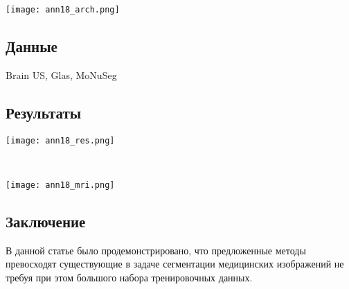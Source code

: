 \begin{minipage}{1.0\linewidth}
    \begin{center}
        \texttt{[image: ann18\_arch.png]} \\
    \end{center}
    
\end{minipage} 
\subsection*{Данные}
Brain US, Glas, MoNuSeg
\subsection*{Результаты}
\begin{minipage}{1.0\linewidth}
    \begin{center}
        \texttt{[image: ann18\_res.png]} \\
    \end{center}
    
\end{minipage} \\

\begin{minipage}{1.0\linewidth}
    \begin{center}
        \texttt{[image: ann18\_mri.png]} \\
    \end{center}
    
\end{minipage}

\subsection*{Заключение}
В данной статье было продемонстрировано, что предложенные методы превосходят существующие 
в задаче сегментации медицинских изображений не требуя при этом большого набора тренировочных данных.





